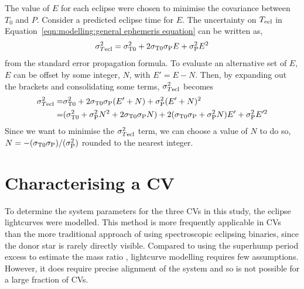 The value of $E$ for each eclipse were chosen to minimise the covariance between $T_0$ and $P$. 
Consider a predicted eclipse time for $E$. The uncertainty on $T_{\rm ecl}$ in Equation~\ref{eqn:modelling:general ephemeris equation} can be written as,
\begin{equation}
    \sigma_{T{\rm ecl}}^2 = \sigma_{\rm T0}^2 + 2\sigma_{\rm T0} \sigma_{\rm P}E + \sigma_{\rm P}^2 E^2
\end{equation}
from the standard error propagation formula.
To evaluate an alternative set of $E$, $E$ can be offset by some integer, $N$, with $E' = E - N$. Then, by expanding out the brackets and consolidating some terms, $\sigma_{T{\rm ecl}}^2$ becomes
\begin{align*}
    \sigma_{T{\rm ecl}}^2 =& \sigma_{\rm T0}^2 + 2\sigma_{\rm T0} \sigma_{\rm P}(E'+N) + \sigma_{\rm P}^2 (E'+N)^2 \\
    =& (\sigma_{\rm T0}^2 + \sigma_{\rm P}^2 N^2 + 2\sigma_{\rm T0} \sigma_{\rm P} N) + 2(\sigma_{\rm T0} \sigma_{\rm P} + \sigma_{\rm P}^2 N)E' + \sigma_{\rm P}^2 E'^2
\end{align*}
Since we want to minimise the $\sigma_{T{\rm ecl}}^2$ term, we can choose a value of $N$ to do so, $N = -(\sigma_{\rm T0}\sigma_{\rm P})/(\sigma_{\rm P}^2)$ rounded to the nearest integer.


\section{Characterising a CV}
\label{sect:method:lightcurve modelling}

To determine the system parameters for the three CVs in this study, the eclipse lightcurves were modelled. This method is more frequently applicable in CVs than the more traditional approach of using spectroscopic eclipsing binaries, since the donor star is rarely directly visible. Compared to using the superhump period excess to estimate the mass ratio \citep{patterson2005, knigge2006}, lightcurve modelling requires few assumptions. However, it does require precise alignment of the system and so is not possible for a large fraction of CVs.

